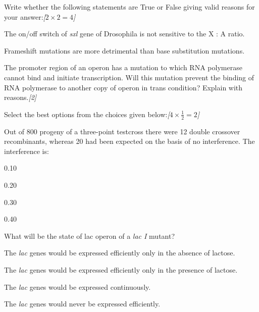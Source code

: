 \documentclass[11pt,a4paper]{article}
\newcommand{\pts}[1]{\hfill   \textit{[#1]}}
\begin{document}
\begin{parts}
  \item Write whether the following statements are True or False giving valid reasons for your answer:\pts{$2  \times 2 = 4$}
  
\begin{parts}
    \item The on/off switch of   \textit{sxl} gene of Drosophila is not sensitive to the X : A ratio.
    \item Frameshift mutations are more detrimental than base substitution mutations.
  \end{parts}

  \item The promoter region of an operon has a mutation to which RNA polymerase cannot bind and initiate transcription. Will this mutation prevent the binding of RNA polymerase to another copy of operon in trans condition? Explain with reasons.\pts{2}

  \item Select the best options from the choices given below:\pts{$4  \times \frac{1}{2} = 2$}
  
\begin{parts}
    \item Out of 800 progeny of a three-point testcross there were 12 double crossover recombinants, whereas 20 had been expected on the basis of no interference. The interference is:
    
\begin{parts}
      \item 0.10
      \item 0.20
      \item 0.30
      \item 0.40
    \end{parts}

    \item What will be the state of lac operon of a   \textit{lac I} mutant?
    
\begin{parts}
      \item The   \textit{lac} genes would be expressed efficiently only in the absence of lactose.
      \item The   \textit{lac} genes would be expressed efficiently only in the presence of lactose.
      \item The   \textit{lac} genes would be expressed continuously.
      \item The   \textit{lac} genes would never be expressed efficiently.
    \end{parts}


\end{parts}
\end{parts}
\end{document}
